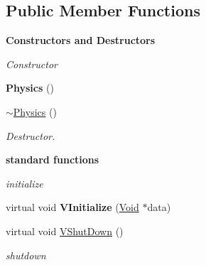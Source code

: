 \subsection*{Public Member Functions}
\begin{Indent}{\bf Constructors and Destructors}\par
{\em \label{_amgrp64fb2b8a2107864a2f56d3f7cc47f3aa}
 Constructor }\begin{DoxyCompactItemize}
\item 
\hypertarget{classContent_1_1Physics_1_1Physics_ac3371801a425185ab357bba2c3b7a3c3}{
{\bfseries Physics} ()}
\label{classContent_1_1Physics_1_1Physics_ac3371801a425185ab357bba2c3b7a3c3}

\item 
\hypertarget{classContent_1_1Physics_1_1Physics_a6e02bd5d81d8d694b874b6da2dc107b7}{
\hyperlink{classContent_1_1Physics_1_1Physics_a6e02bd5d81d8d694b874b6da2dc107b7}{$\sim$Physics} ()}
\label{classContent_1_1Physics_1_1Physics_a6e02bd5d81d8d694b874b6da2dc107b7}

\begin{DoxyCompactList}\small\item\em Destructor. \item\end{DoxyCompactList}\end{DoxyCompactItemize}
\end{Indent}
\begin{Indent}{\bf standard functions}\par
{\em \label{_amgrp57f1c50bd31a278c7d9f58b3e669c84c}
 initialize }\begin{DoxyCompactItemize}
\item 
\hypertarget{classContent_1_1Physics_1_1Physics_a8efe8f036ea7d1cb567af1a2eb1f569e}{
virtual void {\bfseries VInitialize} (\hyperlink{structVoid}{Void} $\ast$data)}
\label{classContent_1_1Physics_1_1Physics_a8efe8f036ea7d1cb567af1a2eb1f569e}

\item 
\hypertarget{classContent_1_1Physics_1_1Physics_adf94f9efd4c7793450c7eeb605590688}{
virtual void \hyperlink{classContent_1_1Physics_1_1Physics_adf94f9efd4c7793450c7eeb605590688}{VShutDown} ()}
\label{classContent_1_1Physics_1_1Physics_adf94f9efd4c7793450c7eeb605590688}

\begin{DoxyCompactList}\small\item\em shutdown \item\end{DoxyCompactList}\end{DoxyCompactItemize}
\end{Indent}
